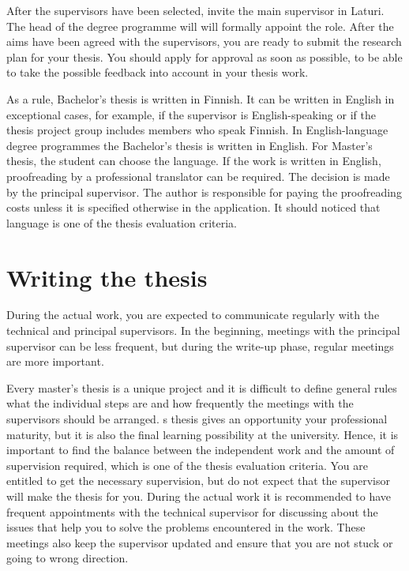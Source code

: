 After the supervisors have been selected, invite the main supervisor in Laturi. The head of the degree programme will will formally appoint the role. After the aims have been agreed with the supervisors, you are ready to submit the research plan for your thesis.  You should apply for approval as soon as possible, to be able to take the possible feedback into account in your thesis work. 

As a rule, Bachelor's thesis is written in Finnish. It can be written in English in exceptional cases, for example, if the supervisor is English-speaking or if the thesis project group includes members who \DIFdelbegin {}\DIFdelend \DIFaddbegin {}\DIFaddend speak Finnish. In English-language degree programmes the Bachelor's thesis is written in English. For Master's thesis, the student can choose the language. If the work is written in English, proofreading by a professional translator can be required. The decision is made by the principal supervisor. The author is responsible for paying the proofreading costs unless it is specified otherwise in the application. It should \DIFdelbegin {}\DIFdelend \DIFaddbegin {}\DIFaddend noticed that language is one of the thesis evaluation criteria.

\section{Writing the thesis}
\label{writing}

During the actual work, you are expected to communicate regularly with the technical and principal supervisors. In the beginning, meetings with the principal supervisor can be less frequent, but during the write-up phase, regular meetings are more important.

Every master’s thesis is a unique project and it is difficult to define general rules what the individual steps are and how frequently the meetings with the supervisors should be arranged. \DIFdelbegin {}\DIFdelend \DIFaddbegin {}\DIFaddend s thesis gives an opportunity \DIFdelbegin {}\DIFdelend \DIFaddbegin {}\DIFaddend your professional maturity, but it is also the final learning possibility at the university. Hence, it is important to find the balance between the independent work and the amount of supervision required, which is one of the thesis evaluation criteria. You are entitled to get the necessary supervision, but do not expect that the supervisor will make the thesis for you. During the actual work it is recommended to have frequent appointments with the technical supervisor for discussing about the issues that help you to solve the problems encountered in the work. These meetings also keep the supervisor updated and ensure that you are not stuck or going to wrong direction.

